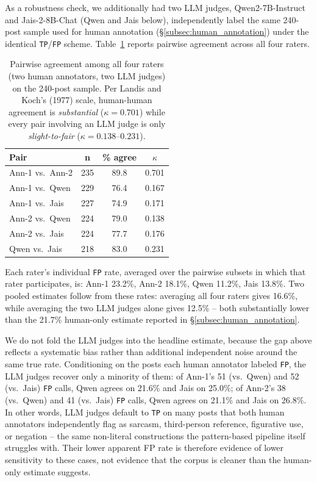 \documentclass[11pt]{article}
\begin{document}
As a robustness check, we additionally had two LLM judges, Qwen2-7B-Instruct \citep{yang-etal-2024-qwen2} and Jais-2-8B-Chat \citep{anwar-etal-2025-jais2} (Qwen and Jais below), independently label the same 240-post sample used for human
annotation (\S\ref{subsec:human_annotation}) under the identical
\texttt{TP}/\texttt{FP} scheme. Table~\ref{tab:iaa_full} reports
pairwise agreement across all four raters.

\begin{table}[h]
\centering
\small
\begin{tabular}{lccc}
\toprule
\textbf{Pair} & \textbf{n} & \textbf{\% agree} & \textbf{$\kappa$} \\
\midrule
Ann-1 vs.\ Ann-2 & 235 & 89.8 & 0.701 \\
Ann-1 vs.\ Qwen & 229 & 76.4 & 0.167 \\
Ann-1 vs.\ Jais & 227 & 74.9 & 0.171 \\
Ann-2 vs.\ Qwen & 224 & 79.0 & 0.138 \\
Ann-2 vs.\ Jais & 224 & 77.7 & 0.176 \\
Qwen vs.\ Jais & 218 & 83.0 & 0.231 \\
\bottomrule
\end{tabular}
\caption{Pairwise agreement among all four raters (two human
annotators, two LLM judges) on the 240-post sample. Per Landis and
Koch's (1977) scale, human-human agreement is \emph{substantial}
($\kappa=0.701$) while every pair involving an LLM judge is only
\emph{slight-to-fair} ($\kappa = 0.138$--$0.231$).}
\label{tab:iaa_full}
\end{table}

Each rater's individual \texttt{FP} rate, averaged over the pairwise
subsets in which that rater participates, is: Ann-1 23.2\%, Ann-2 18.1\%,
Qwen 11.2\%, Jais 13.8\%. Two pooled estimates follow from these rates:
averaging all four raters gives 16.6\%, while averaging the two LLM
judges alone gives 12.5\% -- both substantially lower than the
21.7\% human-only estimate reported in
\S\ref{subsec:human_annotation}.

We do not fold the LLM judges into the headline estimate, because the
gap above reflects a systematic bias rather than additional independent
noise around the same true rate. Conditioning on the posts each human
annotator labeled \texttt{FP}, the LLM judges recover only a minority
of them: of Ann-1's 51 (vs.\ Qwen) and 52 (vs.\ Jais) \texttt{FP} calls,
Qwen agrees on 21.6\% and Jais on 25.0\%; of Ann-2's 38 (vs.\ Qwen) and
41 (vs.\ Jais) \texttt{FP} calls, Qwen agrees on 21.1\% and Jais on
26.8\%. In other words, LLM judges default to \texttt{TP} on many posts
that both human annotators independently flag as sarcasm, third-person
reference, figurative use, or negation -- the same non-literal
constructions the pattern-based pipeline itself struggles with. Their
lower apparent FP rate is therefore evidence of lower sensitivity to
these cases, not evidence that the corpus is cleaner than the
human-only estimate suggests.
\end{document}
